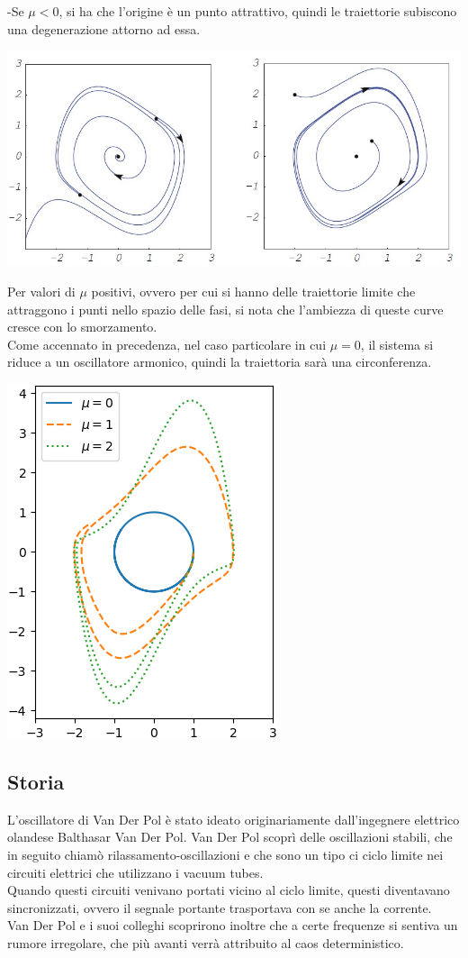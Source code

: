 \documentclass[12pt]{article}
\begin{document}
-Se $\mu<0$, si ha che l'origine è un punto attrattivo, quindi le traiettorie subiscono una degenerazione attorno ad essa. \\
\begin{center}
	\includegraphics[scale=0.7]{Traiettorie}
\end{center}
Per valori di $\mu$ positivi, ovvero per cui si hanno delle traiettorie limite che attraggono i punti nello spazio delle fasi, si nota che l'ambiezza di queste curve cresce con lo smorzamento. \\
Come accennato in precedenza, nel caso particolare in cui $\mu = 0$, il sistema si riduce a un oscillatore armonico, quindi la traiettoria sarà una circonferenza.
\begin{center}
	\includegraphics[scale=1]{Vari smorzamenti} 
\end{center}
\subsection{Storia}
L'oscillatore di Van Der Pol è stato ideato originariamente dall'ingegnere elettrico olandese Balthasar Van Der Pol. Van Der Pol scoprì delle oscillazioni stabili, che in seguito chiamò rilassamento-oscillazioni e che sono un tipo ci ciclo limite nei circuiti elettrici che utilizzano i vacuum tubes. \\
Quando questi circuiti venivano portati vicino al ciclo limite, questi diventavano sincronizzati, ovvero il segnale portante trasportava con se anche la corrente. \\
Van Der Pol e i suoi colleghi scoprirono inoltre che a certe frequenze si sentiva un rumore irregolare, che più avanti verrà attribuito al caos deterministico. 
\end{document}
